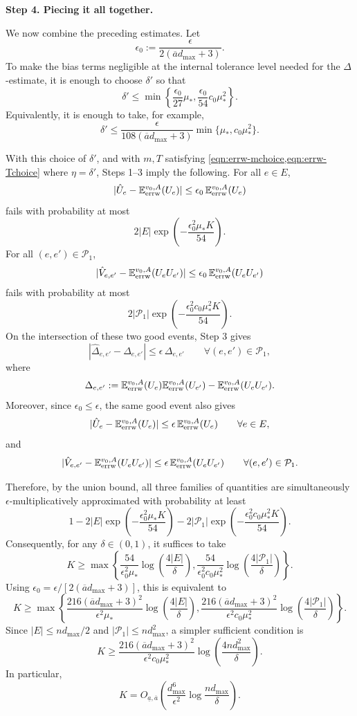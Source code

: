 \documentclass[a4paper, 11pt]{article}
\newcommand{\E}{\mathbb{E}}
\newcommand{\Eerrw}{\E_{\textnormal{errw}}}
\begin{document}
\textbf{Step 4. Piecing it all together.}

We now combine the preceding estimates. 
Let
\[
\epsilon_0:=\frac{\epsilon}{2(\overline a d_{\max}+3)}.
\]
To make the bias terms negligible at the internal tolerance level needed for the
\(\Delta\)-estimate, it is enough to choose \(\delta'\) so that
\[
\delta'
\le
\min\left\{
\frac{\epsilon_0}{27}\mu_*,
\frac{\epsilon_0}{54}c_0\mu_*^2
\right\}.
\]
Equivalently, it is enough to take, for example,
\[
\delta'
\le
\frac{\epsilon}{108(\overline a d_{\max}+3)}
\min\{\mu_*,c_0\mu_*^2\}.
\]

With this choice of \(\delta'\), and with \(m,T\) satisfying \cref{eqn:errw-mchoice,eqn:errw-Tchoice}
where \(\eta=\delta'\), Steps 1--3 imply the following. For all \(e\in E\),
\[
|\hat U_e-\Eerrw^{v_0,A}(U_e)|
\le
\epsilon_0\,\Eerrw^{v_0,A}(U_e)
\]
fails with probability at most
\[
2|E|\exp\left(-\frac{\epsilon_0^2\mu_*K}{54}\right).
\]
For all \((e,e')\in\mathcal P_1\),
\[
|\hat V_{e,e'}-\Eerrw^{v_0,A}(U_eU_{e'})|
\le
\epsilon_0\,\Eerrw^{v_0,A}(U_eU_{e'})
\]
fails with probability at most
\[
2|\mathcal P_1|\exp\left(-\frac{\epsilon_0^2c_0\mu_*^2K}{54}\right).
\]
On the intersection of these two good events, Step 3 gives
\[
|\hat\Delta_{e,e'}-\Delta_{e,e'}|
\le
\epsilon\,\Delta_{e,e'}
\qquad\forall (e,e')\in\mathcal P_1,
\]
where
\[
\Delta_{e,e'}
:=
\Eerrw^{v_0,A}(U_e)\Eerrw^{v_0,A}(U_{e'})
-
\Eerrw^{v_0,A}(U_eU_{e'}).
\]
Moreover, since \(\epsilon_0\le \epsilon\), the same good event also gives
\[
|\hat U_e-\Eerrw^{v_0,A}(U_e)|
\le
\epsilon\,\Eerrw^{v_0,A}(U_e)
\qquad\forall e\in E,
\]
and
\[
|\hat V_{e,e'}-\Eerrw^{v_0,A}(U_eU_{e'})|
\le
\epsilon\,\Eerrw^{v_0,A}(U_eU_{e'})
\qquad\forall (e,e')\in\mathcal P_1.
\]

Therefore, by the union bound, all three families of quantities are simultaneously
\(\epsilon\)-multiplicatively approximated with probability at least
\[
1
-
2|E|\exp\left(-\frac{\epsilon_0^2\mu_*K}{54}\right)
-
2|\mathcal P_1|\exp\left(-\frac{\epsilon_0^2c_0\mu_*^2K}{54}\right).
\]
Consequently, for any \(\delta\in(0,1)\), it suffices to take
\[
K
\ge
\max\left\{
\frac{54}{\epsilon_0^2\mu_*}
\log\left(\frac{4|E|}{\delta}\right),
\frac{54}{\epsilon_0^2c_0\mu_*^2}
\log\left(\frac{4|\mathcal P_1|}{\delta}\right)
\right\}.
\]
Using \(\epsilon_0=\epsilon/[2(\overline a d_{\max}+3)]\), this is equivalent to
\[
K
\ge
\max\left\{
\frac{216(\overline a d_{\max}+3)^2}{\epsilon^2\mu_*}
\log\left(\frac{4|E|}{\delta}\right),
\frac{216(\overline a d_{\max}+3)^2}{\epsilon^2c_0\mu_*^2}
\log\left(\frac{4|\mathcal P_1|}{\delta}\right)
\right\}.
\]
Since \(|E|\le nd_{\max}/2\) and \(|\mathcal P_1|\le nd_{\max}^2\), a simpler sufficient
condition is
\[
K
\ge
\frac{216(\overline a d_{\max}+3)^2}{\epsilon^2c_0\mu_*^2}
\log\left(\frac{4nd_{\max}^2}{\delta}\right).
\]
In particular,
\[
K
=
O_{\underline a,\overline a}
\left(
\frac{d_{\max}^6}{\epsilon^2}
\log\frac{nd_{\max}}{\delta}
\right).
\]
\end{document}

